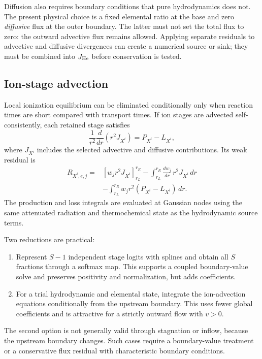 \documentclass[english,a4paper]{my_memo}
\begin{document}
Diffusion also requires boundary conditions that pure hydrodynamics does not.
The present physical choice is a fixed elemental ratio at the base and zero
\emph{diffusive} flux at the outer boundary.  The latter must not set the total
flux to zero: the outward advective flux remains allowed.  Applying separate
residuals to advective and diffusive divergences can create a numerical source
or sink; they must be combined into \(J_{\rm He}\) before conservation is
tested.

\subsection{Ion-stage advection}

Local ionization equilibrium can be eliminated conditionally only when reaction
times are short compared with transport times.  If ion stages are advected
self-consistently, each retained stage satisfies
\begin{equation}
 \frac{1}{r^2}\frac{d}{dr}\left(r^2J_{X^i}\right)
 =P_{X^i}-L_{X^i},
 \label{eq:ionadvection}
\end{equation}
where \(J_{X^i}\) includes the selected advective and diffusive contributions.
Its weak residual is
\begin{align}
 R_{X^i,e,j}={}&
 \left[w_jr^2J_{X^i}\right]_{r_L}^{r_R}
 -\int_{r_L}^{r_R}\frac{dw_j}{dr}\,r^2J_{X^i}\,dr \nonumber\\
 &-\int_{r_L}^{r_R}w_jr^2(P_{X^i}-L_{X^i})\,dr.
 \label{eq:ionweak}
\end{align}
The production and loss integrals are evaluated at Gaussian nodes using the
same attenuated radiation and thermochemical state as the hydrodynamic source
terms.

Two reductions are practical:
\begin{enumerate}
\item Represent \(S-1\) independent stage logits with splines and obtain all
  \(S\) fractions through a softmax map.  This supports a coupled boundary-value
  solve and preserves positivity and normalization, but adds coefficients.
\item For a trial hydrodynamic and elemental state, integrate the ion-advection
  equations conditionally from the upstream boundary.  This uses fewer global
  coefficients and is attractive for a strictly outward flow with \(v>0\).
\end{enumerate}
The second option is not generally valid through stagnation or inflow, because
the upstream boundary changes.  Such cases require a boundary-value treatment
or a conservative flux residual with characteristic boundary conditions.
\end{document}
